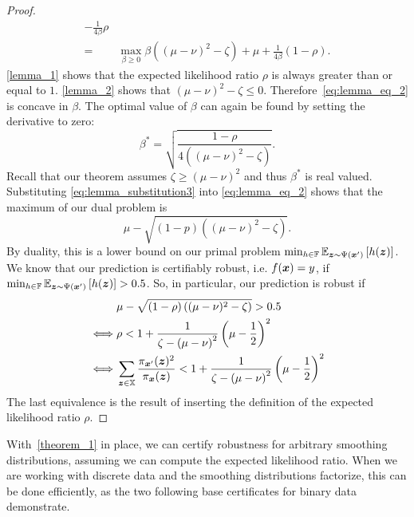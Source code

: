 \begin{proof}
\begin{align}
    - \frac{1}{4 \beta}
    \rho \\\label{eq:lemma_eq_2}
=
& \max_{\beta \geq 0}
    \beta \left((\mu - \nu)^2 - \zeta\right)
    + \mu
    + \frac{1}{4 \beta}
    \left(1 - 
    \rho
    \right).
\end{align}
\cref{lemma_1} shows that the expected likelihood ratio
$\rho$ is always greater than or equal to $1$. \cref{lemma_2} shows that $(\mu - \nu)^2 - \zeta \leq 0$. Therefore~\autoref{eq:lemma_eq_2} is concave in $\beta$.
The optimal value of $\beta$ can again be found by setting the derivative to zero:
\begin{equation}\label{eq:lemma_substitution3}
\beta^* = \sqrt{\frac{1 - \rho}{ 4\left((\mu - \nu)^2 - \zeta\right) }}.
\end{equation}
Recall that our theorem assumes $\zeta \geq \left(\mu - \nu  \right)^2$ and thus $\beta^*$ is real valued.
Substituting \autoref{eq:lemma_substitution3} into \autoref{eq:lemma_eq_2} shows that the maximum of our dual problem is
\begin{equation}
\mu - \sqrt{\left(1-p \right) \left((\mu - \nu)^2 - \zeta\right)}.
\end{equation}
By duality, this is a lower bound on our primal  problem
$\min_{h \in {\mathbb{F}}} 
\mathbb{E}_{{\bm{z}} \sim \Psi({\bm{x}}')}
\left[h({\bm{z}})\right]$.
We know that our prediction is certifiably robust, i.e. $f({\bm{x}}) = y$, if $\min_{h \in {\mathbb{F}}} 
\mathbb{E}_{{\bm{z}} \sim \Psi({\bm{x}}')}
\left[h({\bm{z}})\right] > 0.5$. So, in particular, our prediction is robust if 
\begin{align}
    &\mu - \sqrt{\left(1-\rho \right) \left((\mu - \nu)^2 - \zeta \right)}
    > 0.5
    \\
    \iff
    &
    \rho
    <
    1 + 
    \frac{1}{\zeta - \left(\mu - \nu\right)^2}
    \left(  \mu - \frac{1}{2} \right)^2
    \\
    \iff
    &
\sum_{{\bm{z}} \in {\mathbb{X}}} \frac{\pi_{{\bm{x}}'}({\bm{z}})^2}{\pi_{{\bm{x}}}({\bm{z}})}    <
    1 + 
    \frac{1}{\zeta - \left(\mu - \nu\right)^2}
    \left(  \mu - \frac{1}{2} \right)^2
\end{align}
The last equivalence is the result of inserting the definition of the expected likelihood ratio $\rho$.
\end{proof}
With~\autoref{theorem_1} in place, we can certify robustness for arbitrary smoothing distributions, assuming we can compute the expected likelihood ratio.
When we are working with discrete data and the smoothing distributions factorize, this can be done efficiently,
as the two following base certificates for binary data demonstrate.


